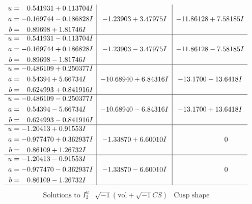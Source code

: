 \documentclass[1p]{elsarticle_modified}
\theoremstyle{definition}
\newcommand{\I}{\sqrt{-1}}
\begin{document}
$$\begin{array}{c|c|c}
\begin{aligned}
u &= \phantom{-}0.541931 + 0.113704 I \\
a &= -0.169744 - 0.186828 I \\
b &= \phantom{-}0.89698 + 1.81746 I\end{aligned}
 & -1.23903 + 3.47975 I & -11.86128 + 7.58185 I \\ \hline\begin{aligned}
u &= \phantom{-}0.541931 - 0.113704 I \\
a &= -0.169744 + 0.186828 I \\
b &= \phantom{-}0.89698 - 1.81746 I\end{aligned}
 & -1.23903 - 3.47975 I & -11.86128 - 7.58185 I \\ \hline\begin{aligned}
u &= -0.486109 + 0.250377 I \\
a &= \phantom{-}0.54394 + 5.66734 I \\
b &= \phantom{-}0.624993 + 0.841916 I\end{aligned}
 & -10.68940 + 6.84316 I & -13.1700 - 13.6418 I \\ \hline\begin{aligned}
u &= -0.486109 - 0.250377 I \\
a &= \phantom{-}0.54394 - 5.66734 I \\
b &= \phantom{-}0.624993 - 0.841916 I\end{aligned}
 & -10.68940 - 6.84316 I & -13.1700 + 13.6418 I \\ \hline\begin{aligned}
u &= -1.20413 + 0.91553 I \\
a &= -0.977470 + 0.362937 I \\
b &= \phantom{-}0.86109 + 1.26732 I\end{aligned}
 & -1.33870 + 6.60010 I & \phantom{-0.000000 } 0 \\ \hline\begin{aligned}
u &= -1.20413 - 0.91553 I \\
a &= -0.977470 - 0.362937 I \\
b &= \phantom{-}0.86109 - 1.26732 I\end{aligned}
 & -1.33870 - 6.60010 I & \phantom{-0.000000 } 0\\
 \hline 
 \end{array}$$\newpage$$\begin{array}{c|c|c}  
\text{Solutions to }I^u_{2}& \I (\text{vol} + \sqrt{-1}CS) & \text{Cusp shape}\\
 \hline 
\begin{aligned}

\end{aligned}
\end{array}$$
\end{document}
